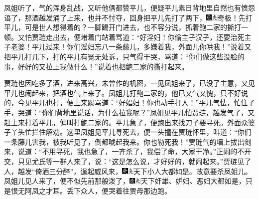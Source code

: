 凤姐听了，气的浑身乱战，又听他俩都赞平儿，便疑平儿素日背地里自然也有愤怨语了，那酒越发涌了上来，也并不忖夺，回身把平儿先打了两下，{\includegraphics[width=3mm]{../Images/00004}\includegraphics[width=3mm]{../Images/00012}\footnotesize \kaishu 奇极！先打平儿，可是世人想得着的？}一脚踢开门进去，也不容分说，抓着鲍二家的撕打一顿。又怕贾琏走出去，便堵着门站着骂道：``好淫妇！你偷主子汉子，还要治死主子老婆！平儿过来！你们淫妇忘八一条藤儿，多嫌着我，外面儿你哄我！''说着又把平儿打几下，打的平儿有冤无处诉，只气得干哭，骂道：``你们做这些没脸的事，好好的又拉上我做什么！''说着也把鲍二家的撕打起来。

贾琏也因吃多了酒，进来高兴，未曾作的机密，一见凤姐来了，已没了主意，又见平儿也闹起来，把酒也气上来了。凤姐儿打鲍二家的，他已又气又愧，只不好说的，今见平儿也打，便上来踢骂道：``好娼妇！你也动手打人！''平儿气怯，忙住了手，哭道：``你们背地里说话，为什么拉我呢？''凤姐见平儿怕贾琏，越发气了，又赶上来打着平儿，偏叫打鲍二家的。平儿急了，便跑出来找刀子要寻死。外面众婆子丫头忙拦住解劝。这里凤姐见平儿寻死去，便一头撞在贾琏怀里，叫道：``你们一条藤儿害我，被我听见了，倒都唬起我来。你也勒死我！''贾琏气的墙上拔出剑来，说道：``不用寻死，我也急了，一齐杀了，我偿了命，大家干净。''正闹的不开交，只见尤氏等一群人来了，说：``这是怎么说，才好好的，就闹起来。''贾琏见了人，越发``倚酒三分醉''，逞起威风来，{\includegraphics[width=3mm]{../Images/00004}\includegraphics[width=3mm]{../Images/00012}\footnotesize \kaishu 天下小人大都如是。}故意要杀凤姐儿。凤姐儿见人来了，便不似先前那般泼了，{\includegraphics[width=3mm]{../Images/00004}\includegraphics[width=3mm]{../Images/00012}\footnotesize \kaishu 天下奸雄、妒妇、恶妇大都如是，只是恨无阿凤之才耳。}丢下众人，便哭着往贾母那边跑。

